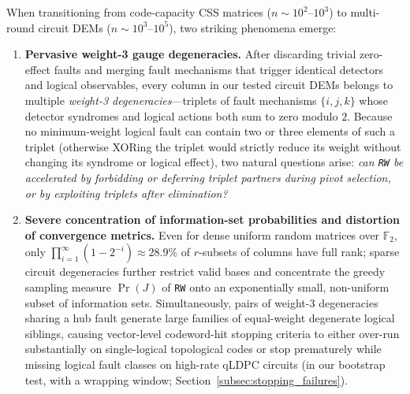 \documentclass[12pt]{article}
\theoremstyle{definition}
\newcommand{\Ftwo}{\mathbb{F}_2}
\newcommand{\ttt}[1]{\texttt{#1}}
\begin{document}
When transitioning from code-capacity CSS matrices ($n \sim 10^2$--$10^3$) to multi-round circuit DEMs
($n \sim 10^3$--$10^5$), two striking phenomena emerge:
\begin{enumerate}[label=(\roman*)]
  \item \textbf{Pervasive weight-3 gauge degeneracies.} After discarding trivial zero-effect faults and merging
    fault mechanisms that trigger identical detectors and logical observables, every column in our tested circuit
    DEMs belongs to multiple \emph{weight-3 degeneracies}---triplets of fault mechanisms $\{i, j, k\}$ whose
    detector syndromes and logical actions both sum to zero modulo $2$. Because no minimum-weight logical fault can
    contain two or three elements of such a triplet (otherwise XORing the triplet would strictly reduce its weight
    without changing its syndrome or logical effect), two natural questions arise: \emph{can \ttt{RW} be
    accelerated by forbidding or deferring triplet partners during pivot selection, or by exploiting triplets after
    elimination?}
  \item \textbf{Severe concentration of information-set probabilities and distortion of convergence metrics.} Even
    for dense uniform random matrices over $\Ftwo$, only $\prod_{i=1}^\infty (1 - 2^{-i}) \approx 28.9\%$ of
    $r$-subsets of columns have full rank; sparse circuit degeneracies further restrict valid bases and concentrate
    the greedy sampling measure $\Pr(J)$ of \ttt{RW} onto an exponentially small, non-uniform subset of information
    sets. Simultaneously, pairs of weight-3 degeneracies sharing a hub fault generate large families of
    equal-weight degenerate logical siblings, causing vector-level codeword-hit stopping criteria to either
    over-run substantially on single-logical topological codes or stop prematurely while missing logical fault
    classes on high-rate qLDPC circuits (in our bootstrap test, with a wrapping window;
    Section~\ref{subsec:stopping_failures}).
\end{enumerate}
\end{document}
